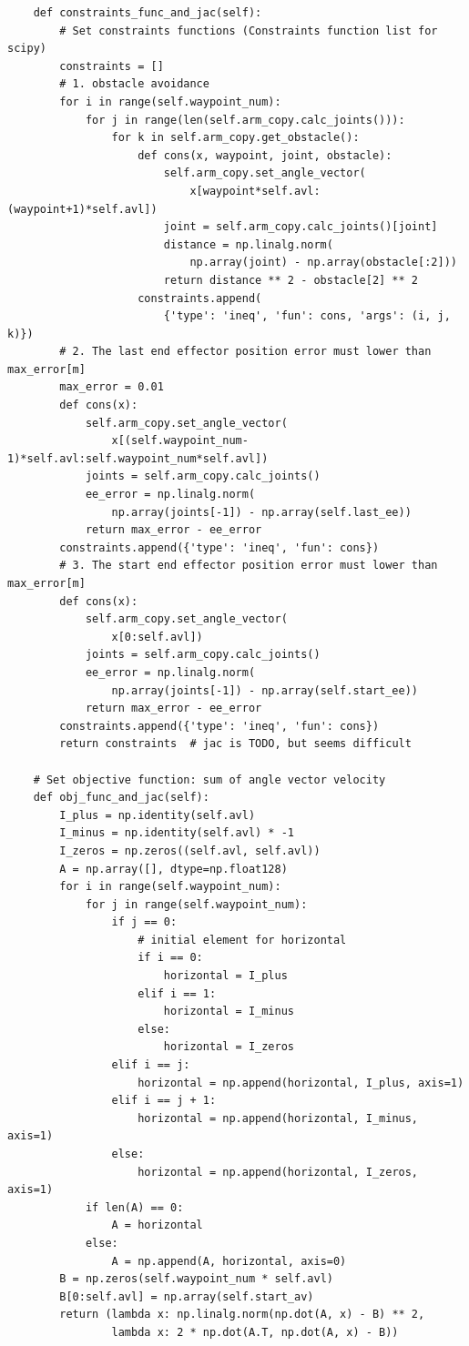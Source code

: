\begin{verbatim}
    def constraints_func_and_jac(self):
        # Set constraints functions (Constraints function list for scipy)
        constraints = []
        # 1. obstacle avoidance
        for i in range(self.waypoint_num):
            for j in range(len(self.arm_copy.calc_joints())):
                for k in self.arm_copy.get_obstacle():
                    def cons(x, waypoint, joint, obstacle):
                        self.arm_copy.set_angle_vector(
                            x[waypoint*self.avl:(waypoint+1)*self.avl])
                        joint = self.arm_copy.calc_joints()[joint]
                        distance = np.linalg.norm(
                            np.array(joint) - np.array(obstacle[:2]))
                        return distance ** 2 - obstacle[2] ** 2
                    constraints.append(
                        {'type': 'ineq', 'fun': cons, 'args': (i, j, k)})
        # 2. The last end effector position error must lower than max_error[m]
        max_error = 0.01
        def cons(x):
            self.arm_copy.set_angle_vector(
                x[(self.waypoint_num-1)*self.avl:self.waypoint_num*self.avl])
            joints = self.arm_copy.calc_joints()
            ee_error = np.linalg.norm(
                np.array(joints[-1]) - np.array(self.last_ee))
            return max_error - ee_error
        constraints.append({'type': 'ineq', 'fun': cons})
        # 3. The start end effector position error must lower than max_error[m]
        def cons(x):
            self.arm_copy.set_angle_vector(
                x[0:self.avl])
            joints = self.arm_copy.calc_joints()
            ee_error = np.linalg.norm(
                np.array(joints[-1]) - np.array(self.start_ee))
            return max_error - ee_error
        constraints.append({'type': 'ineq', 'fun': cons})
        return constraints  # jac is TODO, but seems difficult

    # Set objective function: sum of angle vector velocity
    def obj_func_and_jac(self):
        I_plus = np.identity(self.avl)
        I_minus = np.identity(self.avl) * -1
        I_zeros = np.zeros((self.avl, self.avl))
        A = np.array([], dtype=np.float128)
        for i in range(self.waypoint_num):
            for j in range(self.waypoint_num):
                if j == 0:
                    # initial element for horizontal
                    if i == 0:
                        horizontal = I_plus
                    elif i == 1:
                        horizontal = I_minus
                    else:
                        horizontal = I_zeros
                elif i == j:
                    horizontal = np.append(horizontal, I_plus, axis=1)
                elif i == j + 1:
                    horizontal = np.append(horizontal, I_minus, axis=1)
                else:
                    horizontal = np.append(horizontal, I_zeros, axis=1)
            if len(A) == 0:
                A = horizontal
            else:
                A = np.append(A, horizontal, axis=0)
        B = np.zeros(self.waypoint_num * self.avl)
        B[0:self.avl] = np.array(self.start_av)
        return (lambda x: np.linalg.norm(np.dot(A, x) - B) ** 2,
                lambda x: 2 * np.dot(A.T, np.dot(A, x) - B))


\end{verbatim}
